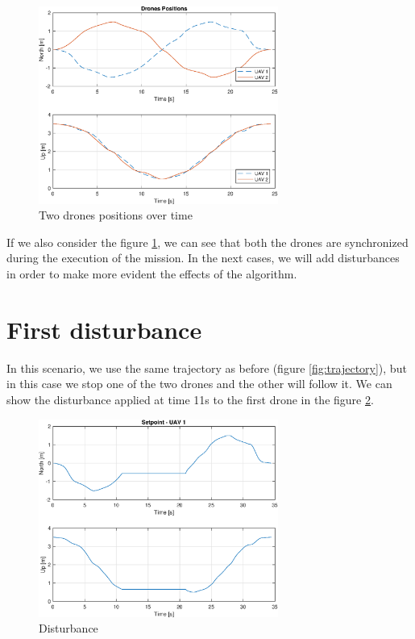 \begin{figure}
\centering
\includegraphics[width=0.7\textwidth]{chapters/chapter-04/figures/overlapped.eps}
\caption{Two drones positions over time}
\label{fig:overlapped}
\end{figure}

If we also consider the figure \ref{fig:overlapped}, we can see that both the drones
are synchronized during the execution of the mission. In the next cases, we will
add disturbances in order to make more evident the effects of the algorithm.


\section{First disturbance}
In this scenario, we use the same trajectory as before (figure \ref{fig:trajectory}),
but in this case we stop one of the two drones and the other will follow it.
We can show the disturbance applied at time 11s to the first drone in the figure \ref{fig:disturbance}.

\begin{figure}
\centering
\includegraphics[width=0.7\textwidth]{chapters/chapter-04/figures/pos_1.eps}
\caption{Disturbance}
\label{fig:disturbance}
\end{figure}

